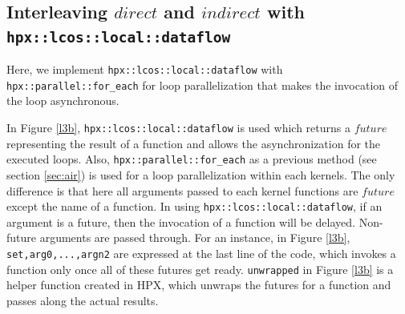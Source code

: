 \documentclass[conference]{IEEEtran}
\begin{document}
\subsection{Interleaving $direct$ and $indirect$ with \texttt{hpx::lcos::local::dataflow}}
\label{sec:data}

Here, we implement \texttt{hpx::lcos::local::dataflow} with \texttt{hpx::parallel::for\_each} for loop parallelization that makes the invocation of the loop asynchronous. 

In Figure \ref{l3b}, \texttt{hpx::lcos::local::dataflow} is used which returns a $future$ representing the result of a function and allows the asynchronization for the executed loops. Also, \texttt{hpx::parallel::for\_each} as a previous method (see section \ref{sec:air}) is used for a loop parallelization within each kernels. The only difference is that here all arguments passed to each kernel functions are $future$ except the name of a function. In using \texttt{hpx::lcos::local::dataflow}, if an argument is a future, then the invocation of a function will be delayed. Non-future arguments are passed through. For an instance, in Figure \ref{l3b}, \texttt{set,arg0,...,argn2} are expressed at the last line of the code, which invokes a function only once all of these futures get ready. \texttt{unwrapped} in Figure \ref{l3b} is a helper function created in HPX, which  unwraps the futures for a function and  passes along the actual results. 
\end{document}
